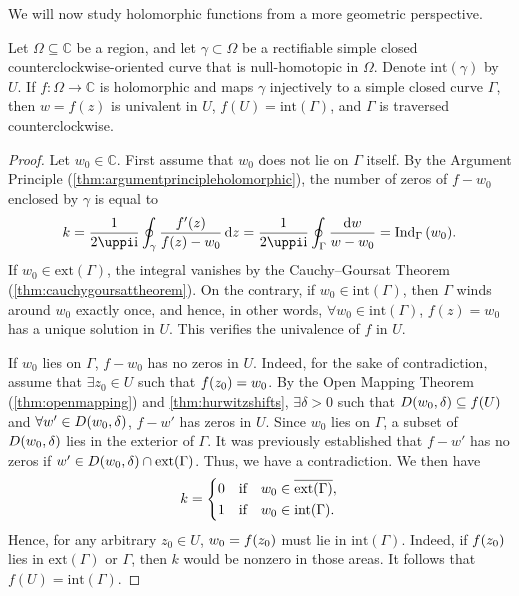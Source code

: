 We will now study holomorphic functions from a more geometric perspective.
\begin{theorem}\label{thm:boundaryofconformalmap}
    Let \(\Omega\subseteq\mathbb{C}\) be a region, and let \(\gamma\subset\Omega\) be a rectifiable simple closed counterclockwise-oriented curve that is null-homotopic in \(\Omega\). Denote \(\mathrm{int}(\gamma)\) by \(U\). If \(f:\Omega\to\mathbb{C}\) is holomorphic and maps \(\gamma\) injectively to a simple closed curve \(\Gamma\), then \(w=f(z)\) is univalent in \(U\), \(f(U)=\mathrm{int}(\Gamma)\), and \(\Gamma\) is traversed counterclockwise.
\end{theorem}
\begin{proof}
    Let \(w_0\in\mathbb{C}\). First assume that \(w_0\) does not lie on \(\Gamma\) itself. By the Argument Principle (\cref{thm:argumentprincipleholomorphic}), the number of zeros of \(f-w_0\) enclosed by \(\gamma\) is equal to \[k=\frac{1}{2\uppi \ii}\oint_\gamma \frac{f'(z)}{f(z)-w_0}\ddz=\frac{1}{2\uppi \ii}\oint_\Gamma\frac{\dd{w}}{w-w_0}=\operatorname{Ind}_{\Gamma}\qty(w_0).\] If \(w_0\in\mathrm{ext}(\Gamma)\), the integral vanishes by the Cauchy--Goursat Theorem (\cref{thm:cauchygoursattheorem}). On the contrary, if \(w_0\in\mathrm{int}(\Gamma)\), then \(\Gamma\) winds around \(w_0\) exactly once, and hence, in other words, \(\forall w_0\in\mathrm{int}(\Gamma)\), \(f(z)=w_0\) has a unique solution in \(U\). This verifies the univalence of \(f\) in \(U\).

    If \(w_0\) lies on \(\Gamma\), \(f-w_0\) has no zeros in \(U\). Indeed, for the sake of contradiction, assume that \(\exists z_0\in U\) such that \(f\qty(z_0)=w_0\). By the Open Mapping Theorem (\cref{thm:openmapping}) and \cref{thm:hurwitzshifts}, \(\exists\delta>0\) such that \(D\qty(w_0,\delta)\subseteq f(U)\) and \(\forall w'\in D\qty(w_0,\delta)\), \(f-w'\) has zeros in \(U\). Since \(w_0\) lies on \(\Gamma\), a subset of \(D\qty(w_0,\delta)\) lies in the exterior of \(\Gamma\). It was previously established that \(f-w'\) has no zeros if \(w'\in D\qty(w_0,\delta)\cap\mathrm{ext}(\Gamma)\). Thus, we have a contradiction. We then have \[k=
        \begin{dcases}
            0 & \qif* w_0\in\overline{\mathrm{ext}(\Gamma)}, \\
            1 & \qif* w_0\in \mathrm{int}(\Gamma).
        \end{dcases}\]
    Hence, for any arbitrary \(z_0\in U\), \(w_0=f\qty(z_0)\) must lie in \(\mathrm{int}(\Gamma)\). Indeed, if \(f\qty(z_0)\) lies in \(\mathrm{ext}(\Gamma)\) or \(\Gamma\), then \(k\) would be nonzero in those areas. It follows that \(f(U)=\mathrm{int}(\Gamma)\).
\end{proof}
